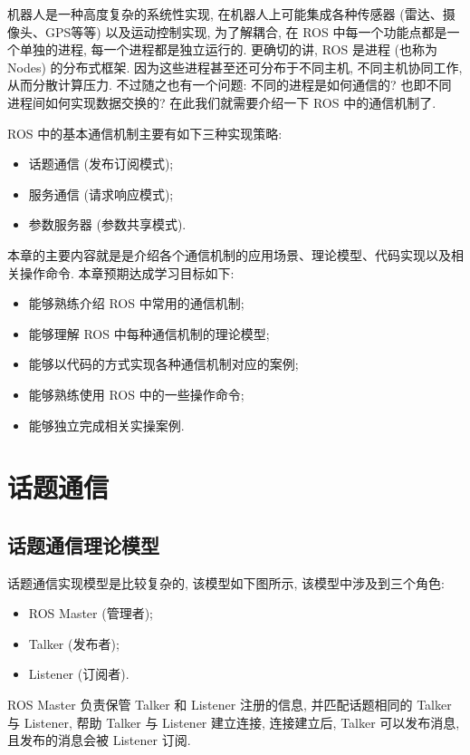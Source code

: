 \documentclass[openany, fontset=windowsold]{ctexbook}
\theoremstyle{kaiti}
\theoremstyle{normal}
\begin{document}
机器人是一种高度复杂的系统性实现, 在机器人上可能集成各种传感器 (雷达、摄像头、GPS等等) 以及运动控制实现, 为了解耦合, 在 ROS 中每一个功能点都是一个单独的进程, 每一个进程都是独立运行的. 更确切的讲, ROS 是进程 (也称为 Nodes) 的分布式框架.  因为这些进程甚至还可分布于不同主机, 不同主机协同工作, 从而分散计算压力. 不过随之也有一个问题: 不同的进程是如何通信的? 也即不同进程间如何实现数据交换的? 在此我们就需要介绍一下 ROS 中的通信机制了.

ROS 中的基本通信机制主要有如下三种实现策略:

\begin{itemize}
  \item 话题通信 (发布订阅模式);
  \item 服务通信 (请求响应模式);
  \item 参数服务器 (参数共享模式).
\end{itemize}

本章的主要内容就是是介绍各个通信机制的应用场景、理论模型、代码实现以及相关操作命令. 本章预期达成学习目标如下:

\begin{itemize}
  \item 能够熟练介绍 ROS 中常用的通信机制;
  \item 能够理解 ROS 中每种通信机制的理论模型;
  \item 能够以代码的方式实现各种通信机制对应的案例;
  \item 能够熟练使用 ROS 中的一些操作命令;
  \item 能够独立完成相关实操案例.
\end{itemize}

\section{话题通信}

\subsection{话题通信理论模型}

话题通信实现模型是比较复杂的, 该模型如下图所示, 该模型中涉及到三个角色:

\begin{itemize}
  \item ROS Master (管理者);
  \item Talker (发布者);
  \item Listener (订阅者).
\end{itemize}

ROS Master 负责保管 Talker 和 Listener 注册的信息, 并匹配话题相同的 Talker 与 Listener, 帮助 Talker 与 Listener 建立连接, 连接建立后, Talker 可以发布消息, 且发布的消息会被 Listener 订阅.
\end{document}
